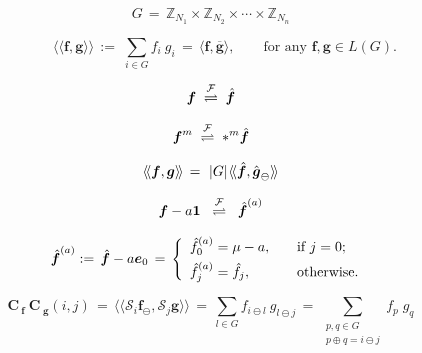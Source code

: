\documentclass[10pt,a4paper]{amsart}
\newcommand{\Int}{\mathbb Z}
\newcommand{\abs}[1]{\vert #1 \vert}
\newcommand{\bs}[1]{{\boldsymbol{#1}}}
\newcommand{\conv}{\ast}
\newcommand{\dimin}[2]{{ #1 }^{\gr{#2}}}
\newcommand{\dotprod}[2]{\langle\!\langle #1, #2 \rangle\!\rangle}
\newcommand{\gr}[1]{( #1 )}
\newcommand{\hatbsf}{{\kern+0.25em}\hat{{\kern-0.25em}\bs{f}}}
\newcommand{\ip}[2]{\langle #1, #2 \rangle}
\begin{document}
\begin{equation} \label{Eq:FiniteAbelianGroup_G}
G \,=\, \Int_{N_1} \times \Int_{N_2} \times \cdots \times \Int_{N_n}
\end{equation}

\begin{equation} \label{Def:dotProduct}
\qquad\dotprod{\bs{f}}{\bs{g}} \,:=\; \sum_{i\in G} f_i \:\! g_i \,=\, \ip{\bs{f}}{\overline{\bs{g}}}, \qquad \text{for any } \bs{f},\bs{g}\in L\gr{G}.
\end{equation}

\begin{equation} \label{Def:F-pair}
\bs{f} \;\stackrel{\mathcal{F}}\rightleftharpoons\; \hatbsf
\end{equation}

\begin{equation} \label{Eq:f^m=*^mfhat}
\bs{f}^m \;\stackrel{\mathcal{F}}\rightleftharpoons\;
\conv^m \hatbsf
\end{equation}

\begin{equation} \label{Eq:Parseval_fg_dotprod}
\dotprod{\bs{f}}{\bs{g}} \,=\ \abs{G} \:\!\dotprod{\hatbsf}{\hat{\bs{g}}_\ominus}
\end{equation}

\begin{equation} \label{Def:a-diminished_F-pair}
\bs{f}-a\bs{1} \;\;\stackrel{\mathcal{F}}\rightleftharpoons\;\;
\dimin{\hatbsf}{a}
\end{equation}

    \begin{equation} \label{Def:a-diminished_Xform}
    \dimin{\hatbsf}{a} :=\, \hatbsf - a\bs{e}_0 \,=\,
    \left\{
      \begin{array}{ll}
        \dimin{\hat{f}}{a}_0 = \mu-a, & \quad\hbox{if $j=0$;} \\[4pt]
        \dimin{\hat{f}}{a}_j = \hat{f}_j,    & \quad\hbox{otherwise.}
      \end{array}
    \right.\;
    \end{equation}

\begin{equation} \label{Eq:C_fC_g_ij}
\bs{C}_{\:\!\!\bs{f}}\:\!\bs{C}_{\;\!\!\bs{g}}\gr{i,j} \,=\, \dotprod{\mathcal{S}_i\bs{f}_{\!\ominus}}{\mathcal{S}_j\bs{g}} \,=\, \sum_{l\in G} f_{i\ominus l} \:\! g_{l\ominus j} \,=\, \sum_{\substack{p,q\in G\\[2pt] p\oplus q = i \ominus j}} f_p \;\! g_q
\end{equation}
\end{document}
